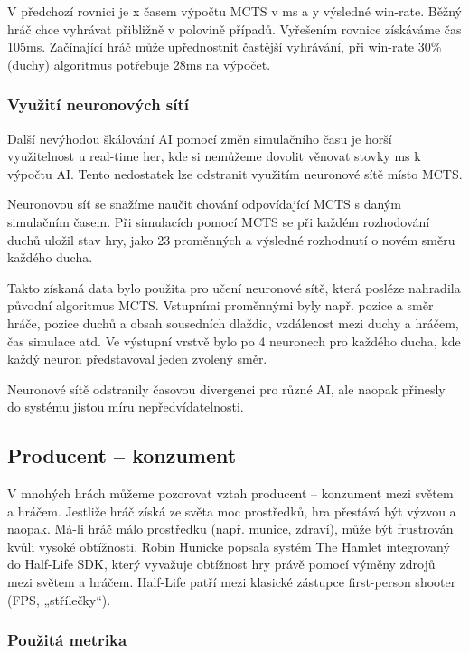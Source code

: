 V předchozí rovnici je x časem výpočtu MCTS v ms a y výsledné win-rate.
Běžný hráč chce vyhrávat přibližně v polovině případů. Vyřešením rovnice získáváme čas 105ms. Začínající hráč může upřednostnit častější vyhrávání, při win-rate 30\% (duchy) algoritmus potřebuje 28ms na výpočet.

\subsubsection{Využití neuronových sítí}
Další nevýhodou škálování AI pomocí změn simulačního času je horší využitelnost u real-time her, kde si nemůžeme dovolit věnovat stovky ms k výpočtu AI. Tento nedostatek lze odstranit využitím neuronové sítě místo MCTS.

Neuronovou síť se snažíme naučit chování odpovídající MCTS s daným simulačním časem. Při simulacích pomocí MCTS se při každém rozhodování duchů uložil stav hry, jako 23 proměnných a výsledné rozhodnutí o novém směru každého ducha.

Takto získaná data bylo použita pro učení neuronové sítě, která posléze nahradila původní algoritmus MCTS. Vstupními proměnnými byly např. pozice a směr hráče, pozice duchů a obsah sousedních dlaždic, vzdálenost mezi duchy a hráčem, čas simulace atd. Ve výstupní vrstvě bylo po 4 neuronech pro každého ducha, kde každý neuron představoval jeden zvolený směr.

Neuronové sítě odstranily časovou divergenci pro různé AI, ale naopak přinesly do systému jistou míru nepředvídatelnosti.

\subsection{Producent – konzument}

V mnohých hrách můžeme pozorovat vztah producent – konzument mezi světem a hráčem. Jestliže hráč získá ze světa moc prostředků, hra přestává být výzvou a naopak. Má-li hráč málo prostředku (např. munice, zdraví), může být frustrován kvůli vysoké obtížnosti.
Robin Hunicke popsala systém The Hamlet integrovaný do Half-Life SDK\cite{20Hun}, který vyvažuje obtížnost hry právě pomocí výměny zdrojů mezi světem a hráčem. Half-Life patří mezi klasické zástupce first-person shooter (FPS, „střílečky“).

\subsubsection{Použitá metrika}

